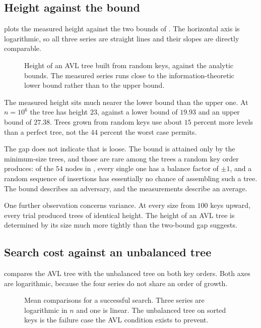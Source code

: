 \subsection{Height against the bound}

 plots the measured height against the two bounds of
. The horizontal axis is logarithmic, so all three series
are straight lines and their slopes are directly comparable.

\begin{figure}[t]
  \centering
  
  \caption{Height of an AVL tree built from random keys, against the analytic
  bounds. The measured series runs close to the information-theoretic lower
  bound rather than to the upper bound.}
  \label{fig:plotheight}
\end{figure}

The measured height sits much nearer the lower bound than the upper one. At
$n = 10^{6}$ the tree has height $23$, against a lower bound of $19.93$ and an
upper bound of $27.38$. Trees grown from random keys use about $15$ percent more
levels than a perfect tree, not the $44$ percent the worst case permits.

The gap does not indicate that  is loose. The bound is
attained only by the minimum-size trees, and those are rare among the trees a
random key order produces: of the $54$ nodes in , every single
one has a balance factor of $\pm 1$, and a random sequence of insertions has
essentially no chance of assembling such a tree. The bound describes an adversary,
and the measurements describe an average.

One further observation concerns variance. At every size from $100$ keys upward,
every trial produced trees of identical height. The height of an AVL tree is
determined by its size much more tightly than the two-bound gap suggests.

\subsection{Search cost against an unbalanced tree}

 compares the AVL tree with the unbalanced tree on both key
orders. Both axes are logarithmic, because the four series do not share an order
of growth.

\begin{figure}[t]
  \centering
  
  \caption{Mean comparisons for a successful search. Three series are
  logarithmic in $n$ and one is linear. The unbalanced tree on sorted keys is the
  failure case the AVL condition exists to prevent.}
  \label{fig:plotsearch}
\end{figure}

